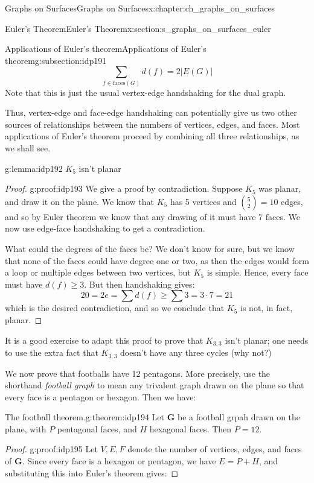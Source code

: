 \documentclass[oneside,10pt,]{book}
\numberwithin{equation}{section}
\newcommand{\bfG}{\mathbf{G}}
\begin{document}
\begin{chapterptx}{Graphs on Surfaces}{}{Graphs on Surfaces}{}{}{x:chapter:ch_graphs_on_surfaces}
\begin{sectionptx}{Euler's Theorem}{}{Euler's Theorem}{}{}{x:section:s_graphs_on_surfaces_euler}
\begin{subsectionptx}{Applications of Euler's theorem}{}{Applications of Euler's theorem}{}{}{g:subsection:idp191}
\begin{equation*}
\sum_{f\in \text{faces}(G)}d(f)=2 |E(G)|
\end{equation*}
Note that this is just the usual vertex-edge handshaking for the dual graph.%
\par
Thus, vertex-edge and face-edge handshaking can potentially give us two other sources of relationships between the numbers of vertices, edges, and faces.  Most applications of Euler's theorem proceed by combining all three relationships, as we shall see.%
\begin{lemma}{}{}{g:lemma:idp192}%
\(K_5\) isn't planar\end{lemma}
\begin{proof}{}{g:proof:idp193}
We give a proof by contradiction.  Suppose \(K_5\) was planar, and draw it on the plane.  We know that \(K_5\) has 5 vertices and \(\binom{5}{2}=10\) edges, and so by Euler theorem we know that any drawing of it must have 7 faces. We now use edge-face handshaking to get a contradiction.%
\par
What could the degrees of the faces be?  We don't know for sure, but we know that none of the faces could have degree one or two, as then the edges would form a loop or multiple edges between two vertices, but \(K_5\) is simple.  Hence, every face must have \(d(f)\geq 3\).  But then handshaking gives:%
%
\begin{equation*}
20=2e=\sum d(f)\geq \sum 3=3\cdot 7=21
\end{equation*}
which is the desired contradiction, and so we conclude that \(K_5\) is not, in fact, planar.%
\end{proof}
It is a good exercise to adapt this proof to prove that \(K_{3,3}\) isn't planar; one needs to use the extra fact that \(K_{3,3}\) doesn't have any three cycles (why not?)%
\par
We now prove that footballs have 12 pentagons.  More precisely, use the shorthand \emph{football graph} to mean any trivalent graph drawn on the plane so that every face is a pentagon or hexagon. Then we have:%
\begin{theorem}{The football theorem.}{}{g:theorem:idp194}%
Let \(\bfG\) be a football grpah drawn on the plane, with \(P\) pentagonal faces, and \(H\) hexagonal faces.  Then \(P=12\).%
\end{theorem}
\begin{proof}{}{g:proof:idp195}
Let \(V, E, F\) denote the number of vertices, edges, and faces of \(\bfG\).  Since every face is a hexagon or pentagon, we have \(E=P+H\), and substituting this into Euler's theorem gives:%

\end{proof}
\end{subsectionptx}
\end{sectionptx}
\end{chapterptx}
\end{document}
